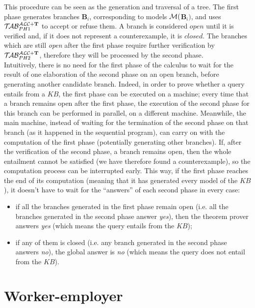 \documentclass[a4paper, 11pt, oneside]{duthesis}
\newcommand{\tip}{{\bf T}}
\newcommand{\emme} {\begin{mathcal}M\end{mathcal}}
\newcommand{\primo}{\mathrel{{\mathcal{T}\!\mathcal{AB}}}_{PH 1}^{\mathcal{ALC}+\mbox{\scriptsize $\tip$}}}
\newcommand{\secondo}{\mathrel{{\mathcal{T}\!\mathcal{AB}}}_{PH 2}^{\mathcal{ALC}+\mbox{\scriptsize $\tip$}}}
\begin{document}
This procedure can be seen as the generation and traversal of a tree.
The first phase generates branches \textbf{B}$_i$, corresponding to models $\emme($\textbf{B}$_i)$, and uses $\primo$ to accept or refuse them.
A branch is considered $open$ until it is verified and, if it does not represent a counterexample, it is $closed$. The branches which are still \emph{open} after the first phase require further verification by $\secondo$, therefore they will be processed by the second phase.\\

Intuitively, there is no need for the first phase of the calculus to wait for the result of one elaboration of the second phase on an open branch, before generating another candidate branch.
Indeed, in order to prove whether a query entails from a $KB$, the first phase can be executed on a machine; every time that a branch remains open after the first phase, the execution of the second phase for this branch can be performed in parallel, on a different machine.
Meanwhile, the main machine, instead of waiting for the termination of the second phase on that branch (as it happened in the sequential program), can carry on with the computation of the first phase (potentially generating other branches).
If, after the verification of the second phase, a branch remains open, then the whole entailment cannot be satisfied (we have therefore found a counterexample), so the computation process can be interrupted early.
This way, if the first phase reaches the end of its computation (meaning that it has generated every model of the $KB$), it doesn't have to wait for the ``answers'' of each second phase in every case:
\begin{itemize}
\item if all the branches generated in the first phase remain open (i.e. all the branches generated in the second phase answer \emph{yes}), then the theorem prover answers \emph{yes} (which means the query entails from the $KB$);
\item if any of them is closed (i.e. any branch generated in the second phase answers \emph{no}), the global answer is \emph{no} (which means the query does not entail from the $KB$).
\end{itemize}

\section{Worker-employer}\label{workemp}
\end{document}
